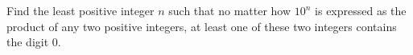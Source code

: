 Find the least positive integer $n$ such that no matter how $10^{n}$ is expressed as the product of any two positive integers, at least one of these two integers contains the digit $0.$